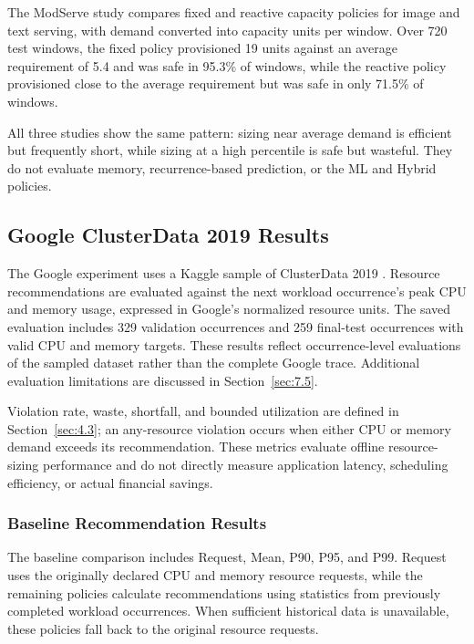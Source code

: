 The ModServe study compares fixed and reactive capacity policies for image and text serving, with demand converted into capacity units per window. Over 720 test windows, the fixed policy provisioned 19 units against an average requirement of 5.4 and was safe in 95.3\% of windows, while the reactive policy provisioned close to the average requirement but was safe in only 71.5\% of windows.

All three studies show the same pattern: sizing near average demand is efficient but frequently short, while sizing at a high percentile is safe but wasteful. They do not evaluate memory, recurrence-based prediction, or the ML and Hybrid policies.

\subsection{Google ClusterData 2019 Results}\label{sec:7.2}

The Google experiment uses a Kaggle sample of ClusterData 2019 \cite{ref7}. Resource recommendations are evaluated against the next workload occurrence's peak CPU and memory usage, expressed in Google's normalized resource units. The saved evaluation includes 329 validation occurrences and 259 final-test occurrences with valid CPU and memory targets. These results reflect occurrence-level evaluations of the sampled dataset rather than the complete Google trace. Additional evaluation limitations are discussed in Section~\ref{sec:7.5}.

Violation rate, waste, shortfall, and bounded utilization are defined in Section~\ref{sec:4.3}; an any-resource violation occurs when either CPU or memory demand exceeds its recommendation. These metrics evaluate offline resource-sizing performance and do not directly measure application latency, scheduling efficiency, or actual financial savings.

\subsubsection{Baseline Recommendation Results}\label{sec:7.2.1}

The baseline comparison includes Request, Mean, P90, P95, and P99. Request uses the originally declared CPU and memory resource requests, while the remaining policies calculate recommendations using statistics from previously completed workload occurrences. When sufficient historical data is unavailable, these policies fall back to the original resource requests.

